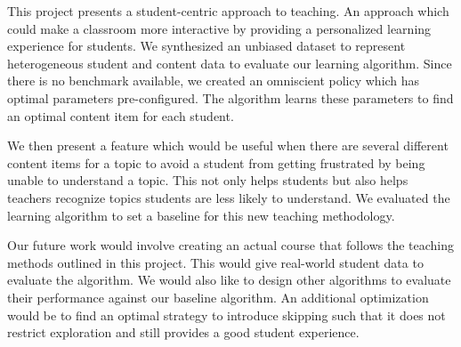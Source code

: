 \label{concl}

This project presents a student-centric approach to teaching. An approach which could make a classroom more interactive by providing a personalized learning experience for students. We synthesized an unbiased dataset to represent heterogeneous student and content data to evaluate our learning algorithm. Since there is no benchmark available, we created an omniscient policy which has optimal parameters pre-configured. The algorithm learns these parameters to find an optimal content item for each student. \par 

We then present a feature which would be useful when there are several different content items for a topic to avoid a student from getting frustrated by being unable to understand a topic. This not only helps students but also helps teachers recognize topics students are less likely to understand. We evaluated the learning algorithm to set a baseline for this new teaching methodology. \par 

Our future work would involve creating an actual course that follows the teaching methods outlined in this project. This would give real-world student data to evaluate the algorithm. We would also like to design other algorithms to evaluate their performance against our baseline algorithm. An additional optimization would be to find an optimal strategy to introduce skipping such that it does not restrict exploration and still provides a good student experience. \par